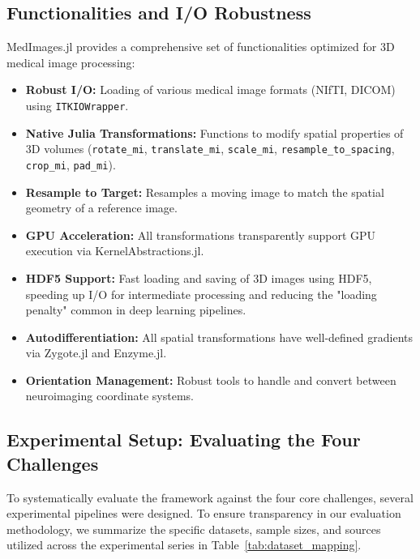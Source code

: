 \documentclass[10pt,letterpaper]{article}
\begin{document}
\subsection*{Functionalities and I/O Robustness}
MedImages.jl provides a comprehensive set of functionalities optimized for 3D medical image processing:
\begin{itemize}
    \item \textbf{Robust I/O:} Loading of various medical image formats (NIfTI, DICOM) using \texttt{ITKIOWrapper}.
    \item \textbf{Native Julia Transformations:} Functions to modify spatial properties of 3D volumes (\texttt{rotate\_mi}, \texttt{translate\_mi}, \texttt{scale\_mi}, \texttt{resample\_to\_spacing}, \texttt{crop\_mi}, \texttt{pad\_mi}).
    \item \textbf{Resample to Target:} Resamples a moving image to match the spatial geometry of a reference image.
    \item \textbf{GPU Acceleration:} All transformations transparently support GPU execution via KernelAbstractions.jl.
    \item \textbf{HDF5 Support:} Fast loading and saving of 3D images using HDF5, speeding up I/O for intermediate processing and reducing the "loading penalty" common in deep learning pipelines.
    \item \textbf{Autodifferentiation:} All spatial transformations have well-defined gradients via Zygote.jl and Enzyme.jl.
    \item \textbf{Orientation Management:} Robust tools to handle and convert between neuroimaging coordinate systems.
\end{itemize}

\subsection*{Experimental Setup: Evaluating the Four Challenges}
To systematically evaluate the framework against the four core challenges, several experimental pipelines were designed. To ensure transparency in our evaluation methodology, we summarize the specific datasets, sample sizes, and sources utilized across the experimental series in Table~\ref{tab:dataset_mapping}.
\end{document}
